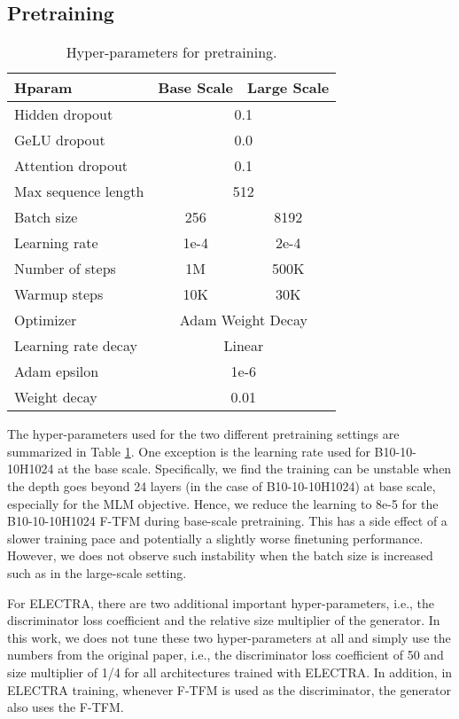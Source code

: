 \documentclass{article}
\theoremstyle{custom}
\begin{document}
\subsection{Pretraining}
\begin{table}[h!]
	\centering
	\begin{tabular}{lcc}
		\toprule
		\bf Hparam          & \bf Base Scale & \bf Large Scale \\
		\midrule
		Hidden dropout      & \multicolumn{2}{c}{0.1} \\
		GeLU dropout        & \multicolumn{2}{c}{0.0} \\
		Attention dropout   & \multicolumn{2}{c}{0.1} \\
		Max sequence length & \multicolumn{2}{c}{512} \\
		Batch size          & 256  & 8192 \\
		Learning rate       & 1e-4 & 2e-4 \\
		Number of steps     & 1M   & 500K \\
		Warmup steps        & 10K  & 30K \\
		Optimizer 		    & \multicolumn{2}{c}{Adam Weight Decay} \\
		Learning rate decay & \multicolumn{2}{c}{Linear} \\
		Adam epsilon        & \multicolumn{2}{c}{1e-6} \\
		Weight decay        & \multicolumn{2}{c}{0.01} \\
		\bottomrule
	\end{tabular}
	\caption{Hyper-parameters for pretraining.}
	\label{tab:hp-pretrain}
	\vspace{-1em}
\end{table}

The hyper-parameters used for the two different pretraining settings are summarized in Table \ref{tab:hp-pretrain}.
One exception is the learning rate used for B10-10-10H1024 at the base scale. 
Specifically, we find the training can be unstable when the depth goes beyond 24 layers (in the case of B10-10-10H1024) at base scale, especially for the MLM objective.
Hence, we reduce the learning to 8e-5 for the B10-10-10H1024 F-TFM during base-scale pretraining.
This has a side effect of a slower training pace and potentially a slightly worse finetuning performance.
However, we does not observe such instability when the batch size is increased such as in the large-scale setting.

For ELECTRA, there are two additional important hyper-parameters, i.e., the discriminator loss coefficient and the relative size multiplier of the generator.
In this work, we does not tune these two hyper-parameters at all and simply use the numbers from the original paper, i.e., the discriminator loss coefficient of 50 and size multiplier of 1/4 for all architectures trained with ELECTRA.
In addition, in ELECTRA training, whenever F-TFM is used as the discriminator, the generator also uses the F-TFM.
\end{document}
